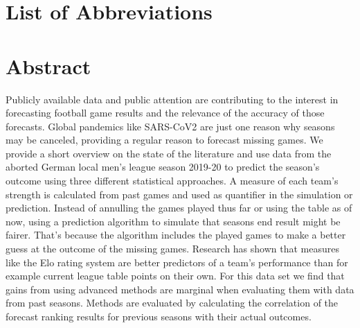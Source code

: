 \documentclass[12pt,a4paper]{article}
\begin{document}
\newpage
\listoffigures
{}

\listoftables
{}

\section*{List of Abbreviations}

\begin{adjustwidth}{1.5em}{0pt}

\begin{acronym}[dummyyyy]


\end{acronym}

\end{adjustwidth}

\restoregeometry

\newpage
{}
\hypertarget{abstract}{%
\section{Abstract}\label{abstract}}

Publicly available data and public attention are contributing to the
interest in forecasting football game results and the relevance of the
accuracy of those forecasts. Global pandemics like SARS-CoV2 are just
one reason why seasons may be canceled, providing a regular reason to
forecast missing games. We provide a short overview on the state of the
literature and use data from the aborted German local men's league
season 2019-20 to predict the season's outcome using three different
statistical approaches. A measure of each team's strength is calculated
from past games and used as quantifier in the simulation or prediction.
Instead of annulling the games played thus far or using the table as of
now, using a prediction algorithm to simulate that seasons end result
might be fairer. That's because the algorithm includes the played games
to make a better guess at the outcome of the missing games. Research has
shown that measures like the Elo rating system are better predictors of
a team's performance than for example current league table points on
their own. For this data set we find that gains from using advanced
methods are marginal when evaluating them with data from past seasons.
Methods are evaluated by calculating the correlation of the forecast
ranking results for previous seasons with their actual outcomes.
\end{document}
